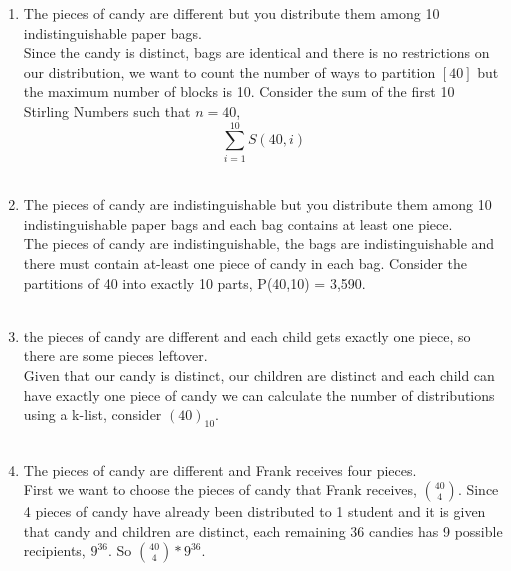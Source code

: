 \documentclass{amsart}
\begin{document}
\begin{enumerate}
\begin{enumerate}
	
	
	
	
	\item The pieces of candy are different but you distribute them among 10 indistinguishable paper bags.\\
	Since the candy is distinct, bags are identical and there is no restrictions on our distribution, we want to count the number of ways to partition $[40]$ but the maximum number of blocks is 10. Consider the sum of the first 10 Stirling Numbers such that $n=40$,\\
\begin{equation*}
\sum_{i = 1}^{10} S(40,i)
\end{equation*}\\

	
	
	
	\item The pieces of candy are indistinguishable but you distribute them among 10 indistinguishable paper bags and each bag contains at least one piece.\\ 
The pieces of candy are indistinguishable, the bags are indistinguishable and there must contain at-least one piece of candy in each bag. Consider the partitions of 40 into exactly 10 parts, P(40,10) = 3,590.\\\\
	
	
	
	
	\item the pieces of candy are different and each child gets exactly one piece, so there are some pieces leftover.\\
	Given that our candy is distinct, our children are distinct and each child can have exactly one piece of candy we can calculate the number of distributions using a k-list, consider $(40)_{10}$.\\\\
	
	
	
	
	\item The pieces of candy are different and Frank receives four pieces.\\
	First we want to choose the pieces of candy that Frank receives, ${40 \choose 4}$. Since 4 pieces of candy have already been distributed to 1 student and it is given that candy and children are distinct, each remaining 36 candies has 9 possible recipients, $9^{36}$. So ${40 \choose 4}*9^{36}$.
\end{enumerate}

\vspace{1in}








\end{enumerate}
\end{document}
